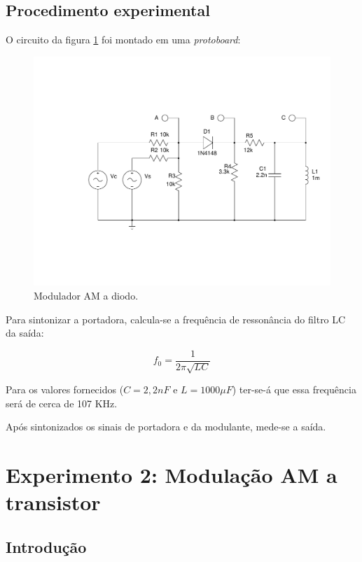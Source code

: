 \documentclass[]{report}
\begin{document}
\section{Procedimento experimental}
O circuito da figura \ref{fig:demodulador_AM_diodo} foi montado em uma \textit{protoboard}:
\begin{figure}[H]
\centering 
\begin{center}
\includegraphics[scale=0.4,clip]{./imagens/AM_Modulator_Diode}
\end{center}
\caption{Modulador AM a diodo.}
\label{fig:demodulador_AM_diodo}
\end{figure}

Para sintonizar a portadora, calcula-se a frequência de ressonância do filtro LC da saída:

\begin{equation}
f_0 = \frac{1}{2 \pi \sqrt{LC}}
\end{equation}

Para os valores fornecidos ($C = 2,2 nF$ e $L = 1000 \mu F$) ter-se-á que essa frequência será de cerca de 107 KHz. 

Após sintonizados os sinais de portadora e da modulante, mede-se a saída.

\chapter{Experimento 2: Modulação AM a transistor}
\section{Introdução}
\end{document}
